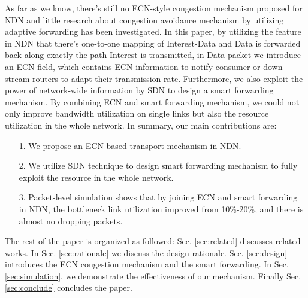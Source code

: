 As far as we know, there's still no ECN-style congestion mechanism proposed for NDN and little research about congestion avoidance mechanism by utilizing adaptive forwarding has been investigated. In this paper, by utilizing the feature in NDN that there's one-to-one mapping of Interest-Data and Data is forwarded back along exactly the path Interest is transmitted, in Data packet we introduce an ECN field, which contains ECN information to notify consumer or down-stream routers to adapt their transmission rate. Furthermore, we also exploit the power of network-wide information by SDN\cite{SDN} to design a smart forwarding mechanism. By combining ECN and smart forwarding mechanism, we could not only improve bandwidth utilization on single links but also the resource utilization in the whole network. In summary, our main contributions are:

\begin{enumerate}
	\item[1.] We propose an ECN-based transport mechanism in NDN.
	\item[2.] We utilize SDN technique to design smart forwarding mechanism to fully exploit the resource in the whole network.
	\item[3.] Packet-level simulation shows that by joining ECN and smart forwarding in NDN, the bottleneck link utilization improved from 10\%-20\%, and there is almost no dropping packets.
\end{enumerate}


The rest of the paper is organized as followed: Sec. \ref{sec:related} discusses related works. In Sec. \ref{sec:rationale} we discuss the design rationale. Sec. \ref{sec:design} introduces the ECN congestion mechanism and the smart forwarding. In Sec. \ref{sec:simulation}, we demonstrate the effectiveness of our mechanism. Finally Sec. \ref{sec:conclude} concludes the paper.
